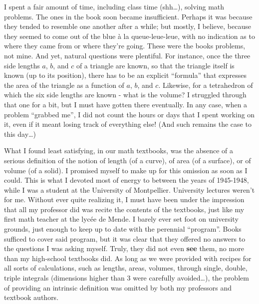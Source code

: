 I spent a fair amount of time, including class time (shh\ldots), solving math problems.
The ones in the book soon became insufficient. Perhaps it was because they tended to
resemble one another after a while; but mostly, I believe, because they seemed
to come out of the blue \`a la queue-leue-leue,
with no indication as to where they came from or where they're going.
These were the books problems, not mine. And yet, natural questions were plentiful. For
instance, once the three side lengths $a$, $b$, and $c$ of a triangle are known, so that the
triangle itself is known (up to its position), there has to be an explicit ``formula''
that expresses the area of the triangle as a function of $a$, $b$, and $c$. Likewise, for
a tetrahedron of which the six side lengths are known - what is the volume? I struggled
through that one for a bit, but I must have gotten there eventually. In any case, when a
problem ``grabbed me'', I did not count the hours or days that I spent working on it, 
even if it meant losing track of everything else! (And such remains the case to this
day\ldots)

What I found least satisfying, in our math textbooks, was the absence of 
a serious definition of the notion of length (of a curve), of area (of a surface), or of
volume (of a solid). I promised myself to make up for this omission as soon as I could. 
This is what I devoted most of energy to between the years of 1945-1948, while I was a
student at the University of Montpellier. University lectures weren't for me. Without ever
quite realizing it, 
I must have been under the impression 
that all my professor did was recite the contents
of the textbooks, just like my first math teacher at the lyc\'ee de Mende.
I barely ever set foot on university grounds, just enough to keep up to date with 
the perennial ``program''. Books sufficed to cover said program, but it was clear that
they offered no answers to the questions I was asking myself. Truly, they did not even
\textbf{see} them, no more than my high-school textbooks did. As long as we were provided
with recipes for all sorts of calculations, such as lengths, areas, volumes, through single,
double, triple integrals (dimensions higher than 3 were carefully avoided\ldots), the
problem of providing an intrinsic definition was omitted by both my professors and
textbook authors. 

